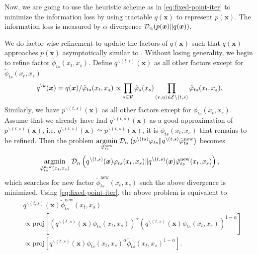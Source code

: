 \documentclass[conference,onecolumn]{IEEEtran}
\begin{document}
Now, we are going to use the heuristic scheme as in \autoref{eq:fixed-point-iter} to minimize the information loss by using tractable $q(\bm{x})$ to represent $p(\bm{x})$. The information loss is measured by $\alpha$-divergence $\mathcal{D}_{\alpha}(p(\bm{x}) \| q(\bm{x}))$.

We do factor-wise refinement to update the factors of $q(\bm{x})$ such that $q(\bm{x})$ approaches $p(\bm{x})$ asymptotically similar to \cite{divergence-measures-and-message-passing,Minka:2001:EPA:647235.720257}. Without losing generality, we begin to refine factor $\tilde{\phi}_{ts}(x_t, x_s)$. Define $q^{\backslash (t,s)}(\bm{x})$ as all other factors except for $\tilde{\phi}_{ts}(x_t, x_s)$
\begin{equation}
  q^{\backslash k}(\bm{x}) = q(\bm{x})/\tilde{\varphi}_{ts}(x_t, x_s)
  \propto \prod_{{s\in \mathcal{V}}} \tilde{\varphi}_s(x_s) \prod_{(v,u) \in
    \mathcal{E}\backslash (t,s)} \tilde{\varphi}_{ts}(x_t, x_s).
\end{equation}
Similarly, we have $p^{\backslash (t,s)}(\bm{x})$ as all other factors except for ${\phi}_{ts}(x_t, x_s)$. Assume that we already have had $q^{\backslash (t,s)}(\bm{x})$ as a good approximation of $p^{\backslash (t,s)}(\bm{x})$, i.e. $q^{\backslash (t,s)}(\bm{x}) \simeq p^{\backslash (t,s)}(\bm{x})$, it is $\tilde{\phi}_{ts}(x_t, x_s)$ that remains to be refined. 
Then the problem $\underset{\tilde{\varphi}_{ts}^{\mathrm{new}}}{\operatorname{argmin}}\; \mathcal{D}_{\alpha}\left(  p^{\backslash (ts)}\varphi_{ts}\|q^{\backslash (t,s)}\tilde{\varphi}_{ts}^{\mathrm{new}}\right)$ becomes \vspace{-0.3cm}
\begin{equation}
  \underset{\tilde{\varphi}_{ts}^{\mathrm{new}}(x_t, x_s)}{\operatorname{argmin}}\;
  \mathcal{D}_{\alpha}\left( q^{\backslash (t,s)}(\bm{x}){\varphi}_{ts}(x_t, x_s)
    \|q^{\backslash (t,s)}(\bm{x})\tilde{\varphi}_{ts}^{\mathrm{new}}(x_t, x_s) \right),
\end{equation}
which searches for new factor $\tilde{\phi}_{ts}^{\mathrm{new}}(x_t, x_s)$ such the above divergence is minimized.
Using \autoref{eq:fixed-point-iter}, the above problem is equivalent to
\begin{align}\label{eq:update-rule}
  &q^{\backslash (t,s)}(\bm{x})\tilde{\phi}_{ts}^{\mathrm{new}}(x_t, x_s)  \nonumber\\
  &\propto \text{proj}\left[ \left( q^{\backslash (t,s)}(\bm{x}){\phi}_{ts}(x_t, x_s) \right)^{\alpha} \left(q^{\backslash (t,s)}(\bm{x})\tilde{\phi}_{ts}(x_t, x_s)  \right)^{1-\alpha} \right] \nonumber \\
  & \propto \text{proj}\left[ q^{\backslash
    (t,s)}(\bm{x}){\phi}_{ts}(x_t, x_s)^{\alpha} \tilde{\phi}_{ts}(x_t, x_s)^{1-\alpha} \right].
\end{align}
\end{document}
